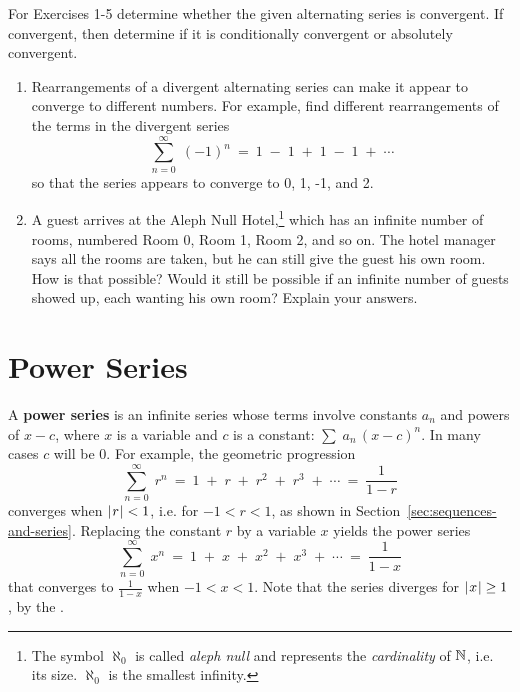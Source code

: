 \divider
\vspace{2mm}
\startexercises\label{sec9dot3}
{\small
{}
\par\noindent For Exercises 1-5 determine whether the given alternating series is
convergent. If convergent, then determine if it is conditionally convergent or
absolutely convergent.
\begin{enumerate}[\bfseries 1.]
 \item Rearrangements of a divergent alternating series can make it appear to
 converge to different numbers. For example, find different rearrangements of
 the terms in the divergent series
\[
\sum_{n=0}^{\infty} \;(-1)^n ~=~ 1 \;-\; 1 \;+\; 1 \;-\; 1 \;+\; \cdots
\]
 so that the series appears to converge to 0, 1, -1, and 2.
 \item A guest arrives at the Aleph Null Hotel,\footnote{The symbol $\aleph_0$
 is called \emph{aleph null} and represents the \emph{cardinality} of
 $\mathbb{N}$, i.e. its size. $\aleph_0$ is the smallest infinity.} which has an
 infinite number of rooms, numbered Room 0, Room 1, Room 2, and so on. The hotel
 manager says all the rooms are taken, but he can still give the guest his own
 room. How is that possible? Would it still be possible if an infinite number of
 guests showed up, each wanting his own room? Explain your answers.
\end{enumerate}
}
\newpage
\section{Power Series}\label{sec:power-series}
A \textbf{power series} is an infinite series whose
terms involve constants $a_n$ and powers of $x-c$, where $x$ is a variable and
$c$ is a constant: $\sum\;a_n\,(x-c)^n$. In many cases $c$ will be 0. For
example, the geometric progression
\[
\sum_{n=0}^{\infty} \;r^n ~=~ 
1 \;+\; r \;+\; r^2 \;+\; r^3 \;+\; \cdots ~=~  \frac{1}{1-r}
\]
converges when $\lvert\mspace{1mu}r\mspace{1mu}\rvert < 1$, i.e. for $-1<r<1$, as shown in Section~\ref{sec:sequences-and-series}.
Replacing the constant $r$ by a variable $x$ yields the power series
\begin{equation}\label{eqn:1over1minusx}
\sum_{n=0}^{\infty} \;x^n ~=~ 
1 \;+\; x \;+\; x^2 \;+\; x^3 \;+\; \cdots ~=~  \frac{1}{1-x}
\end{equation}
that converges to $\frac{1}{1-x}$ when $-1<x<1$. Note that the series diverges
for $\lvert\mspace{1mu}x\mspace{1mu}\rvert\ge 1$, by the .

